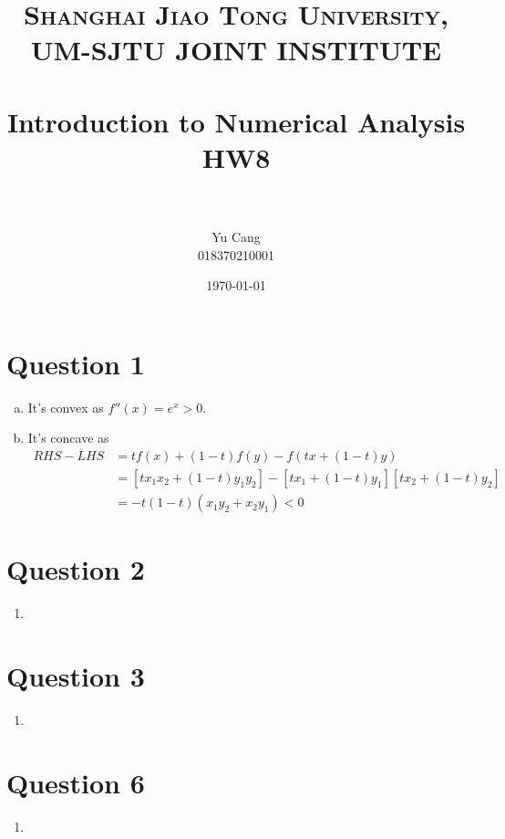 \documentclass[paper=a4, fontsize=11pt]{scrartcl} %
\title{	
\normalfont \normalsize 
\textsc{Shanghai Jiao Tong University, UM-SJTU JOINT INSTITUTE} \\ [25pt] %
\horrule{0.5pt} \\[0.4cm] %
\huge Introduction to Numerical Analysis \\ HW8 \\ %
\horrule{2pt} \\[0.5cm] %
}
\author{Yu Cang \\ 018370210001} %
\date{\normalsize \today} %
\numberwithin{equation}{section} %
\numberwithin{figure}{section} %
\numberwithin{table}{section} %
\begin{document}
\maketitle %

\section{Question 1}
	\begin{enumerate}[(a)]
		\item
			It's convex as $f''(x) = e^x > 0$.
		\item 
			It's concave as
			\begin{equation}
				\begin{aligned}
				  RHS-LHS & = t f(x) + (1-t)f(y) - f(tx+(1-t)y)\\
						  & = [t x_1 x_2 + (1-t)y_1 y_2] -[t x_1 + (1-t)y_1][t x_2 + (1-t)y_2]\\
						  & = -t(1-t)(x_1 y_2 + x_2 y_1) < 0
				\end{aligned}
			\end{equation}

	\end{enumerate}

\section{Question 2}
	\begin{enumerate}
		\item 
		
		
	\end{enumerate}
\section{Question 3}
\begin{enumerate}
	\item 

\end{enumerate}
\section{Question 6}
	\begin{enumerate}
		\item 
		
	\end{enumerate}
\end{document}
